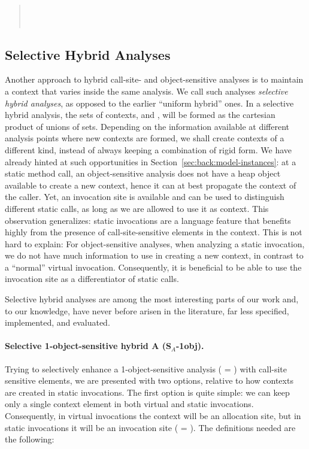 \begin{quote}
 \\
 \\
\end{quote}


\subsection{Selective Hybrid Analyses}

Another approach to hybrid call-site- and object-sensitive analyses is to maintain a context that varies inside the same analysis. We call such analyses \emph{selective hybrid analyses}, as opposed to the earlier ``uniform hybrid'' ones. In a selective hybrid analysis, the sets of contexts,  and , will be formed as the cartesian product of unions of sets. Depending on the information available at different analysis points where new contexts are formed, we shall create contexts of a different kind, instead of always keeping a combination of rigid form. We have already hinted at such opportunities in Section~\ref{sec:back:model-instances}: at a static method call, an object-sensitive analysis does not have a heap object available to create a new context, hence it can at best propagate the context of the caller. Yet, an invocation site is available and can be used to distinguish different static calls, as long as we are allowed to use it as context. This observation generalizes: static invocations are a language feature that benefits highly from the presence of call-site-sensitive elements in the context. This is not hard to explain: For object-sensitive analyses, when analyzing a static invocation, we do not have much information to use in creating a new context, in contrast to a ``normal'' virtual invocation. Consequently, it is beneficial to be able to use the invocation site as a differentiator of static calls.

Selective hybrid analyses are among the most interesting parts of our work and, to our knowledge, have never before arisen in the literature, far less specified, implemented, and evaluated.

\paragraph[Selective 1-object-sensitive (-A)]{Selective 1-object-sensitive hybrid A (S$_A$-1obj).}
Trying to selectively enhance a 1-object-sensitive analysis ( = \args{\{$\star$\}}) with call-site sensitive elements, we are presented with two options, relative to how contexts are created in static invocations. The first option is quite simple: we can keep only a single context element in both virtual and static invocations. Consequently, in virtual invocations the context will be an allocation site, but in static invocations it will be an invocation site ( = ). The definitions needed are the following:

